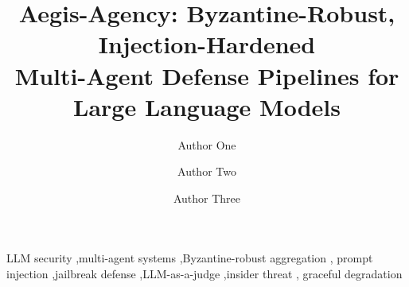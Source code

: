 \documentclass[preprint,12pt]{elsarticle}
\theoremstyle{definition}
\theoremstyle{remark}
\newcommand{\Aegis}{\textsf{Aegis-Agency}\xspace}
\begin{document}
\begin{frontmatter}

\title{\Aegis: Byzantine-Robust, Injection-Hardened\\
Multi-Agent Defense Pipelines for Large Language Models}

\author[inst1]{Author One}
\author[inst1]{Author Two}
\author[inst2]{Author Three}



\begin{keyword}
LLM security \sep multi-agent systems \sep Byzantine-robust aggregation \sep
prompt injection \sep jailbreak defense \sep LLM-as-a-judge \sep insider threat \sep
graceful degradation
\end{keyword}

\end{frontmatter}















\appendix





\end{document}
